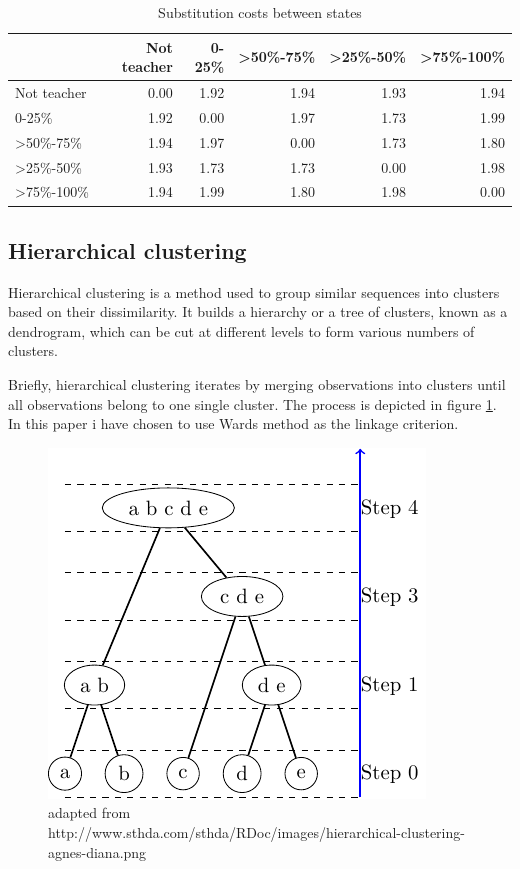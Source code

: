 \documentclass[
]{article}
\begin{document}
\begin{table}

\caption{\label{tab:cost}Substitution costs between states}
\centering
\begin{tabular}[t]{l|r|r|r|r|r}
\hline
  & Not teacher & 0-25\% & >50\%-75\% & >25\%-50\% & >75\%-100\%\\
\hline
Not teacher & 0.00 & 1.92 & 1.94 & 1.93 & 1.94\\
\hline
0-25\% & 1.92 & 0.00 & 1.97 & 1.73 & 1.99\\
\hline
>50\%-75\% & 1.94 & 1.97 & 0.00 & 1.73 & 1.80\\
\hline
>25\%-50\% & 1.93 & 1.73 & 1.73 & 0.00 & 1.98\\
\hline
>75\%-100\% & 1.94 & 1.99 & 1.80 & 1.98 & 0.00\\
\hline
\end{tabular}
\end{table}

\hypertarget{hierarchical-clustering}{%
\subsection{Hierarchical clustering}\label{hierarchical-clustering}}

Hierarchical clustering is a method used to group similar sequences into clusters based on their dissimilarity. It builds a hierarchy or a tree of clusters, known as a dendrogram, which can be cut at different levels to form various numbers of clusters.

Briefly, hierarchical clustering iterates by merging observations into clusters until all observations belong to one single cluster. The process is depicted in figure \ref{fig:clus-ex}. In this paper i have chosen to use Wards method as the linkage criterion.

\begin{figure}[H]
\includegraphics{In-it-for-the-long-run_kollekolle_files/figure-latex/clus-ex-1} \caption{adapted from http://www.sthda.com/sthda/RDoc/images/hierarchical-clustering-agnes-diana.png}\label{fig:clus-ex}
\end{figure}
\end{document}
